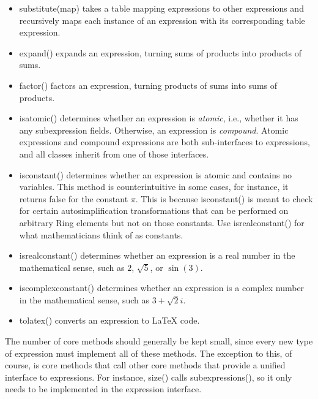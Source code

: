 \documentclass{article}
\begin{document}
\begin{itemize}
    \item {\ttfamily substitute(map)} takes a table mapping expressions to other expressions and recursively maps each instance of an expression with its corresponding table expression.
    
    \item {\ttfamily expand()} expands an expression, turning sums of products into products of sums.
    
    \item {\ttfamily factor()} factors an expression, turning products of sums into sums of products.
    
    \item {\ttfamily isatomic()} determines whether an expression is \emph{atomic}, i.e., whether it has any subexpression fields. Otherwise, an expression is \emph{compound}. Atomic expressions and compound expressions are both sub-interfaces to expressions, and all classes inherit from one of those interfaces.
    
    \item {\ttfamily isconstant()} determines whether an expression is atomic and contains no variables. This method is counterintuitive in some cases, for instance, it returns {\ttfamily false} for the constant $\pi$. This is because {\ttfamily isconstant()} is meant to check for certain autosimplification  transformations that can be performed on arbitrary {\ttfamily Ring} elements but not on those constants. Use {\ttfamily isrealconstant()} for what mathematicians think of as constants.
    
    \item {\ttfamily isrealconstant()} determines whether an expression is a real number in the mathematical sense, such as $2$, $\sqrt{5}$, or $\sin(3)$.
    
    \item {\ttfamily iscomplexconstant()} determines whether an expression is a complex number in the mathematical sense, such as $3 + \sqrt{2}i$.
    
    \item {\ttfamily tolatex()} converts an expression to \LaTeX{} code.
\end{itemize}

The number of core methods should generally be kept small, since every new type of expression must implement all of these methods. The exception to this, of course, is core methods that call other core methods that provide a unified interface to expressions. For instance, {\ttfamily size()} calls {\ttfamily subexpressions()}, so it only needs to be implemented in the expression interface.
\end{document}
